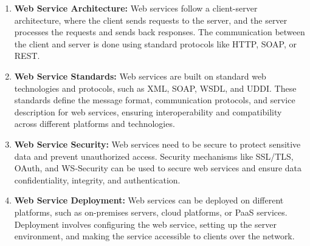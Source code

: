 \documentclass[11pt]{article}
\begin{document}
\begin{enumerate}
    \item \textbf{Web Service Architecture:} Web services follow a client-server architecture, where the client sends requests to the server, and the server processes the requests and sends back responses. The communication between the client and server is done using standard protocols like HTTP, SOAP, or REST.
    \item \textbf{Web Service Standards:} Web services are built on standard web technologies and protocols, such as XML, SOAP, WSDL, and UDDI. These standards define the message format, communication protocols, and service description for web services, ensuring interoperability and compatibility across different platforms and technologies.
    \item \textbf{Web Service Security:} Web services need to be secure to protect sensitive data and prevent unauthorized access. Security mechanisms like SSL/TLS, OAuth, and WS-Security can be used to secure web services and ensure data confidentiality, integrity, and authentication.
    \item \textbf{Web Service Deployment:} Web services can be deployed on different platforms, such as on-premises servers, cloud platforms, or PaaS services. Deployment involves configuring the web service, setting up the server environment, and making the service accessible to clients over the network.
\end{enumerate}
\end{document}
